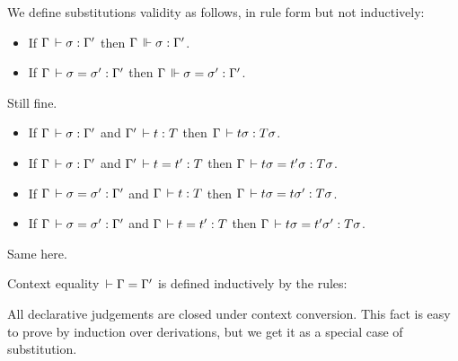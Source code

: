 \documentclass[a4paper,english]{lipics-utf8x}
\begin{document}
  We define substitutions validity as follows, in rule form but not inductively:
  \begin{mathc}
    \qquad
  \end{mathc}

  \begin{lemma}
    \leavevmode
    \begin{itemize}
      \item If $\Gamma \,\vdash \sigma : \Gamma'$ then
      $\Gamma \,\Vdash \sigma : \Gamma'$.
      \item If $\Gamma \,\vdash \sigma = \sigma' : \Gamma'$ then
      $\Gamma \,\Vdash \sigma = \sigma' : \Gamma'$.
    \end{itemize}
  \end{lemma}
  Still fine.

  \begin{lemma}
    \leavevmode
    \begin{itemize}
      \item If $\Gamma \,\vdash \sigma : \Gamma'$ and $\Gamma' \,\vdash t : T$
      then $\Gamma \,\vdash t \sigma : T \sigma$.
      \item If $\Gamma \,\vdash \sigma : \Gamma'$ and $\Gamma' \,\vdash t = t' : T$
      then $\Gamma \,\vdash t \sigma = t' \sigma : T \sigma$.
      \item If $\Gamma \,\vdash \sigma = \sigma' : \Gamma'$ and $\Gamma \,\vdash t : T$
      then $\Gamma \,\vdash t \sigma = t \sigma' : T \sigma$.
      \item If $\Gamma \,\vdash \sigma = \sigma' : \Gamma'$ and
      $\Gamma \,\vdash t = t' : T$ then
      $\Gamma \,\vdash t \sigma = t' \sigma' : T \sigma$.
    \end{itemize}
  \end{lemma}
  Same here.


  Context equality $\,\vdash \Gamma = \Gamma'$ is defined inductively by the rules:
  \begin{mathc}
    \ru{}{\der \cdot = \cdot}
    \qquad
  \end{mathc}
  All declarative judgements are closed under context conversion.
  This fact is easy to prove by induction over derivations, but we get it as a
  special case of substitution.
\end{document}
